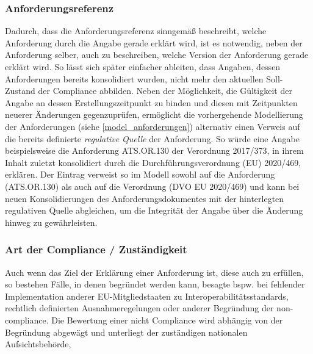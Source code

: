 \subsubsection{Anforderungsreferenz}

Dadurch, dass die Anforderungsreferenz sinngemäß beschreibt, welche Anforderung durch die Angabe gerade erklärt wird, ist es notwendig, neben der Anforderung selber, auch zu beschreiben, welche Version der Anforderung gerade erklärt wird. 
So lässt sich später einfacher ableiten, dass Angaben, dessen Anforderungen bereits konsolidiert wurden, nicht mehr den aktuellen Soll-Zustand der Compliance abbilden. 
Neben der Möglichkeit, die Gültigkeit der Angabe an dessen Erstellungszeitpunkt zu binden und diesen mit Zeitpunkten neuerer Änderungen gegenzuprüfen, ermöglicht die vorhergehende Modellierung der Anforderungen (siehe \ref{model_anforderungen}) alternativ einen Verweis auf die bereits definierte \textit{regulative Quelle} der Anforderung. 
So würde eine Angabe beispielsweise die Anforderung \textsf{ATS.OR.130} der Verordnung 2017/373, in ihrem Inhalt zuletzt konsolidiert durch die Durchführungsverordnung (EU) 2020/469, erklären. 
Der Eintrag verweist so im Modell sowohl auf die Anforderung (\textsf{ATS.OR.130}) als auch auf die Verordnung (DVO EU 2020/469) und kann bei neuen Konsolidierungen des Anforderungsdokumentes mit der hinterlegten regulativen Quelle abgleichen, um die Integrität der Angabe über die Änderung hinweg zu gewährleisten.





\subsubsection{Art der Compliance / Zuständigkeit}

Auch wenn das Ziel der Erklärung einer Anforderung ist, diese auch zu erfüllen, so bestehen Fälle, in denen begründet werden kann, besagte 
bspw. bei fehlender Implementation anderer EU-Mitgliedstaaten zu Interoperabilitätsstandards, rechtlich definierten Ausnahmeregelungen oder anderer Begründung der non-compliance.
Die Bewertung einer nicht Compliance wird abhängig von der Begründung abgewägt und unterliegt der zuständigen nationalen Aufsichtsbehörde, 

